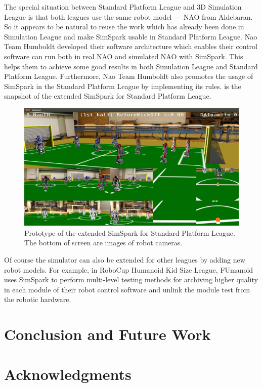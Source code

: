 \documentclass{llncs}
\begin{document}
The special situation between Standard Platform League and 3D Simulation League is that both leagues use the same robot model — NAO from Aldebaran.
So it appears to be natural to reuse the work which has already been done in Simulation League and make SimSpark usable in Standard Platform League.
Nao Team Humboldt developed their software architecture\cite{SCPR2010} which enables their control software can run both in real NAO and simulated NAO with SimSpark. This helps them to achieve some good results in both Simulation League and Standard Platform League.
Furthermore, Nao Team Humboldt also promotes the usage of SimSpark in the Standard Platform League by implementing its rules.  is the snapshot of the extended SimSpark for Standard Platform League.

\begin{figure}
  \centering
  \includegraphics[width = 0.95\columnwidth]{simspark-spl}
  \caption{Prototype of the extended SimSpark for Standard Platform League.
    The bottom of screen are images of robot cameras.}
  \label{f:simspark-spl}
\end{figure}

Of course the simulator can also be extended for other leagues by adding new robot models.
For example, in RoboCup Humanoid Kid Size League, FUmanoid\cite{Donat2012} uses
SimSpark to perform multi-level testing methods for archiving higher
quality in each module of their robot control software and unlink the
module test from the robotic hardware.


\section{Conclusion and Future Work}

\section*{Acknowledgments}



\end{document}
